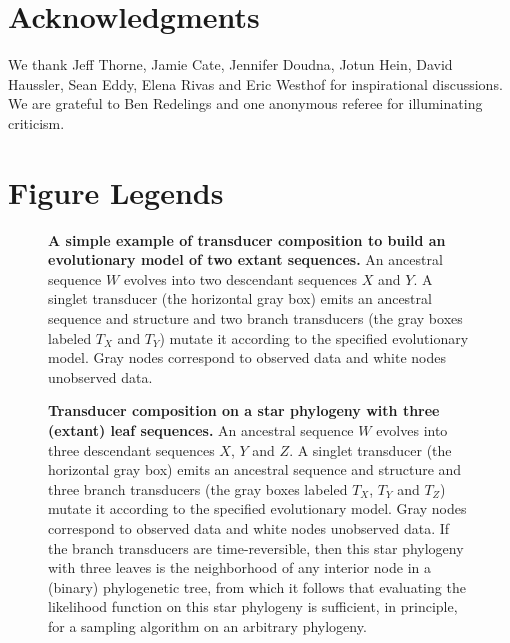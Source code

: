 \documentclass[10pt]{article}
\begin{document}
\section*{Acknowledgments}

We thank
Jeff Thorne,
Jamie Cate,
Jennifer Doudna,
Jotun Hein,
David Haussler,
Sean Eddy,
Elena Rivas and
Eric Westhof
for inspirational discussions.
We are grateful to Ben Redelings and one anonymous referee for illuminating criticism.




\clearpage
\section*{Figure Legends}

\begin{figure}[!ht]
  \centering
   \caption{
     \textbf{A simple example of transducer composition to build an
       evolutionary model of two extant sequences.}
    An ancestral sequence $W$ evolves into two descendant sequences $X$ and $Y$.
     A singlet transducer (the horizontal gray box) emits an ancestral sequence and structure
     and two branch transducers (the gray boxes labeled $T_X$ and $T_Y$)
     mutate it according to the specified evolutionary model.
     Gray nodes correspond to observed data and white nodes unobserved data.
   }
 \end{figure}
 
 \begin{figure}[!ht]
   \centering
   \caption{
     \textbf{Transducer composition on a star phylogeny with three
       (extant) leaf sequences.}
     An ancestral sequence $W$ evolves into three descendant sequences $X$, $Y$ and $Z$.
     A singlet transducer (the horizontal gray box) emits an ancestral sequence and structure
     and three branch transducers (the gray boxes labeled $T_X$, $T_Y$ and $T_Z$)
     mutate it according to the specified evolutionary model.
     Gray nodes correspond to observed data and white nodes unobserved data.
     If the branch transducers are time-reversible, then this star phylogeny with three leaves is
     the neighborhood of any interior node in a (binary) phylogenetic tree, 
     from which it follows that evaluating the likelihood function
     on this star phylogeny is sufficient, in principle, for a sampling algorithm on an arbitrary phylogeny.
   }
 \end{figure}
 
\end{document}
